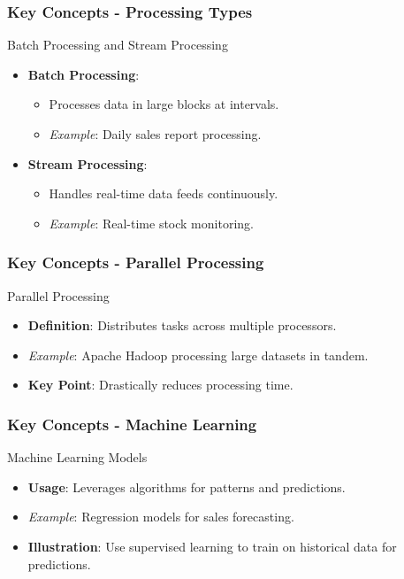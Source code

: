 \documentclass[aspectratio=169]{beamer}
\begin{document}
\begin{frame}[fragile]
    \frametitle{Key Concepts - Processing Types}
    \begin{block}{Batch Processing and Stream Processing}
        \begin{itemize}
            \item \textbf{Batch Processing}:
              \begin{itemize}
                  \item Processes data in large blocks at intervals.
                  \item \textit{Example}: Daily sales report processing.
              \end{itemize}
            \item \textbf{Stream Processing}:
              \begin{itemize}
                  \item Handles real-time data feeds continuously.
                  \item \textit{Example}: Real-time stock monitoring.
              \end{itemize}
        \end{itemize}
    \end{block}
\end{frame}

\begin{frame}[fragile]
    \frametitle{Key Concepts - Parallel Processing}
    \begin{block}{Parallel Processing}
        \begin{itemize}
            \item \textbf{Definition}: Distributes tasks across multiple processors.
            \item \textit{Example}: Apache Hadoop processing large datasets in tandem.
            \item \textbf{Key Point}: Drastically reduces processing time.
        \end{itemize}
    \end{block}
\end{frame}

\begin{frame}[fragile]
    \frametitle{Key Concepts - Machine Learning}
    \begin{block}{Machine Learning Models}
        \begin{itemize}
            \item \textbf{Usage}: Leverages algorithms for patterns and predictions.
            \item \textit{Example}: Regression models for sales forecasting.
            \item \textbf{Illustration}: Use supervised learning to train on historical data for predictions.
        \end{itemize}
    \end{block}
\end{frame}
\end{document}
